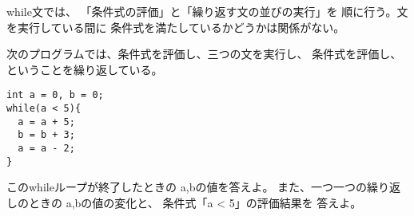 \documentclass[12pt,a4j]{jarticle}
\newcounter{toi}
\def\toi{%
\bigskip\bigskip\noindent
\addtocounter{toi}{1}
\shadowbox{\bfseries\large 問\thetoi}
\nopagebreak[4]\bigskip\nopagebreak[4]
}
\begin{document}





%
%
%



\toi

{\ttfamily while}文では、
「条件式の評価」と「繰り返す文の並びの実行」を
順に行う。文を実行している間に
条件式を満たしているかどうかは関係がない。

次のプログラムでは、条件式を評価し、三つの文を実行し、
条件式を評価し、ということを繰り返している。

\begin{verbatim}
int a = 0, b = 0;
while(a < 5){
  a = a + 5;
  b = b + 3;
  a = a - 2;
}
\end{verbatim}

この{\ttfamily while}ループが終了したときの
{\ttfamily a,b}の値を答えよ。
また、一つ一つの繰り返しのときの
{\ttfamily a,b}の値の変化と、
条件式「{\ttfamily a < 5}」の評価結果を
答えよ。

\end{document}

